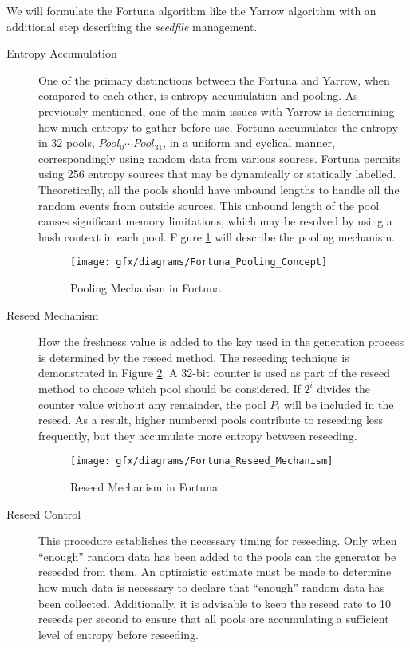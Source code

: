 We will formulate the Fortuna algorithm like the Yarrow algorithm with an additional step describing the \textit{seedfile} management.

\begin{description}
	\item[Entropy Accumulation] One of the primary distinctions between the Fortuna and Yarrow, when compared to each other, is entropy accumulation and pooling. As previously mentioned, one of the main issues with Yarrow is determining how much entropy to gather before use. Fortuna accumulates the entropy in 32 pools, $Pool_{0}\cdots Pool_{31}$, in a uniform and cyclical manner, correspondingly using random data from various sources. Fortuna permits using 256 entropy sources that may be dynamically or statically labelled. Theoretically, all the pools should have unbound lengths to handle all the random events from outside sources. This unbound length of the pool causes significant memory limitations, which may be resolved by using a hash context in each pool. Figure \ref{fig:3:12} will describe the pooling mechanism.
	\begin{figure}[htbp]
		\centering
		\texttt{[image: gfx/diagrams/Fortuna\_Pooling\_Concept]}
		\caption{Pooling Mechanism in Fortuna \cite{FTI-2006}}
		\label{fig:3:12}
	\end{figure}
	
	\item[Reseed Mechanism] How the freshness value is added to the key used in the generation process is determined by the reseed method. The reseeding technique is demonstrated in Figure \ref{fig:3:13}. A 32-bit counter is used as part of the reseed method to choose which pool should be considered. If $2^{i}$ divides the counter value without any remainder, the pool $P_{i}$ will be included in the reseed. As a result, higher numbered pools contribute to reseeding less frequently, but they accumulate more entropy between reseeding.
	\begin{figure}[htbp]
		\centering
		\texttt{[image: gfx/diagrams/Fortuna\_Reseed\_Mechanism]}
		\caption{Reseed Mechanism in Fortuna}
		\label{fig:3:13}
	\end{figure}
	
	\item[Reseed Control] This procedure establishes the necessary timing for reseeding. Only when “enough” random data has been added to the pools can the generator be reseeded from them. An optimistic estimate must be made to determine how much data is necessary to declare that “enough” random data has been collected. Additionally, it is advisable to keep the reseed rate to 10 reseeds per second \cite{FT-2011} to ensure that all pools are accumulating a sufficient level of entropy before reseeding.
	

\end{description}
